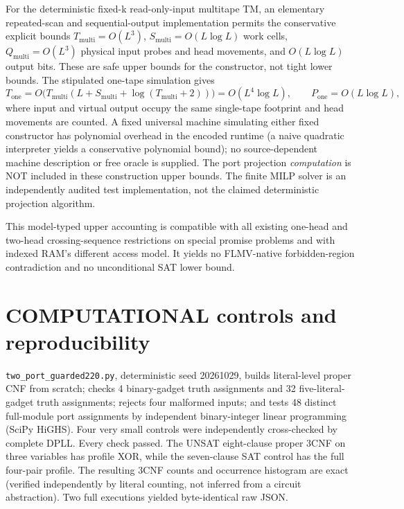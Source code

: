 \documentclass[11pt]{article}
\begin{document}
For the deterministic fixed-k read-only-input multitape TM, an elementary repeated-scan and sequential-output implementation permits the conservative explicit bounds $T_{\mathrm{multi}}=O(L^3)$, $S_{\mathrm{multi}}=O(L\log L)$ work cells, $Q_{\mathrm{multi}}=O(L^3)$ physical input probes and head movements, and $O(L\log L)$ output bits. These are safe upper bounds for the constructor, not tight lower bounds. The stipulated one-tape simulation gives
\[
 T_{\mathrm{one}}=O\big(T_{\mathrm{multi}}(L+S_{\mathrm{multi}}+\log(T_{\mathrm{multi}}+2))\big)=O(L^4\log L),
 \qquad P_{\mathrm{one}}=O(L\log L),
\]
where input and virtual output occupy the same single-tape footprint and head movements are counted. A fixed universal machine simulating either fixed constructor has polynomial overhead in the encoded runtime (a naive quadratic interpreter yields a conservative polynomial bound); no source-dependent machine description or free oracle is supplied. The port projection \emph{computation} is NOT included in these construction upper bounds. The finite MILP solver is an independently audited test implementation, not the claimed deterministic projection algorithm.

This model-typed upper accounting is compatible with all existing one-head and two-head crossing-sequence restrictions on special promise problems and with indexed RAM's different access model. It yields no FLMV-native forbidden-region contradiction and no unconditional SAT lower bound.

\section{COMPUTATIONAL controls and reproducibility}
\texttt{two\_port\_guarded220.py}, deterministic seed 20261029, builds literal-level proper CNF from scratch; checks 4 binary-gadget truth assignments and 32 five-literal-gadget truth assignments; rejects four malformed inputs; and tests 48 distinct full-module port assignments by independent binary-integer linear programming (SciPy HiGHS). Four very small controls were independently cross-checked by complete DPLL. Every check passed. The UNSAT eight-clause proper 3CNF on three variables has profile XOR, while the seven-clause SAT control has the full four-pair profile. The resulting 3CNF counts and occurrence histogram are exact (verified independently by literal counting, not inferred from a circuit abstraction). Two full executions yielded byte-identical raw JSON.
\end{document}
